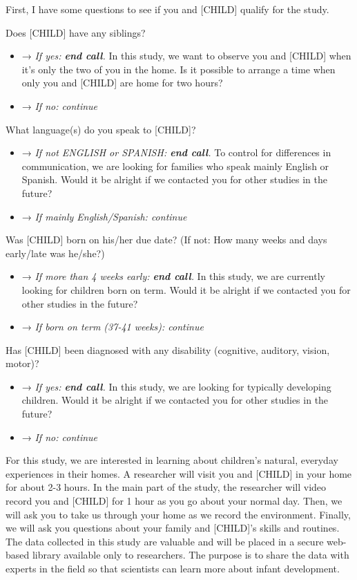 \documentclass[
]{book}
\providecommand{\tightlist}{%
  \setlength{\itemsep}{0pt}\setlength{\parskip}{0pt}}
\begin{document}
First, I have some questions to see if you and {[}CHILD{]} qualify for the study.

Does {[}CHILD{]} have any siblings?

\begin{itemize}
\tightlist
\item
  → \emph{If yes: \textbf{end call}.} In this study, we want to observe you and {[}CHILD{]} when it's only the two of you in the home. Is it possible to arrange a time when only you and {[}CHILD{]} are home for two hours?
\item
  → \emph{If no: continue}
\end{itemize}

What language(s) do you speak to {[}CHILD{]}?

\begin{itemize}
\tightlist
\item
  → \emph{If not ENGLISH or SPANISH: \textbf{end call}.} To control for differences in communication, we are looking for families who speak mainly English or Spanish. Would it be alright if we contacted you for other studies in the future?
\item
  → \emph{If mainly English/Spanish: continue}
\end{itemize}

Was {[}CHILD{]} born on his/her due date? (If not: How many weeks and days early/late was he/she?)

\begin{itemize}
\tightlist
\item
  → \emph{If more than 4 weeks early: \textbf{end call}.} In this study, we are currently looking for children born on term. Would it be alright if we contacted you for other studies in the future?
\item
  → \emph{If born on term (37-41 weeks): continue}
\end{itemize}

Has {[}CHILD{]} been diagnosed with any disability (cognitive, auditory, vision, motor)?

\begin{itemize}
\tightlist
\item
  → \emph{If yes: \textbf{end call}.} In this study, we are looking for typically developing children. Would it be alright if we contacted you for other studies in the future?
\item
  → \emph{If no: continue}
\end{itemize}

For this study, we are interested in learning about children's natural, everyday experiences in their homes. A researcher will visit you and {[}CHILD{]} in your home for about 2-3 hours. In the main part of the study, the researcher will video record you and {[}CHILD{]} for 1 hour as you go about your normal day. Then, we will ask you to take us through your home as we record the environment. Finally, we will ask you questions about your family and {[}CHILD{]}'s skills and routines. The data collected in this study are valuable and will be placed in a secure web-based library available only to researchers. The purpose is to share the data with experts in the field so that scientists can learn more about infant development.
\end{document}
